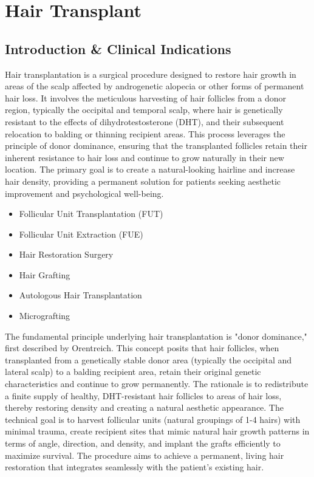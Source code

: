 \chapter{Hair Transplant}

\section*{Introduction \& Clinical Indications}
Hair transplantation is a surgical procedure designed to restore hair growth in areas of the scalp affected by androgenetic alopecia or other forms of permanent hair loss. It involves the meticulous harvesting of hair follicles from a donor region, typically the occipital and temporal scalp, where hair is genetically resistant to the effects of dihydrotestosterone (DHT), and their subsequent relocation to balding or thinning recipient areas. This process leverages the principle of donor dominance, ensuring that the transplanted follicles retain their inherent resistance to hair loss and continue to grow naturally in their new location. The primary goal is to create a natural-looking hairline and increase hair density, providing a permanent solution for patients seeking aesthetic improvement and psychological well-being.

\begin{itemize}
  \item Follicular Unit Transplantation (FUT)
  \item Follicular Unit Extraction (FUE)
  \item Hair Restoration Surgery
  \item Hair Grafting
  \item Autologous Hair Transplantation
  \item Micrografting
\end{itemize}

The fundamental principle underlying hair transplantation is "donor dominance," first described by Orentreich. This concept posits that hair follicles, when transplanted from a genetically stable donor area (typically the occipital and lateral scalp) to a balding recipient area, retain their original genetic characteristics and continue to grow permanently. The rationale is to redistribute a finite supply of healthy, DHT-resistant hair follicles to areas of hair loss, thereby restoring density and creating a natural aesthetic appearance. The technical goal is to harvest follicular units (natural groupings of 1-4 hairs) with minimal trauma, create recipient sites that mimic natural hair growth patterns in terms of angle, direction, and density, and implant the grafts efficiently to maximize survival. The procedure aims to achieve a permanent, living hair restoration that integrates seamlessly with the patient's existing hair.


